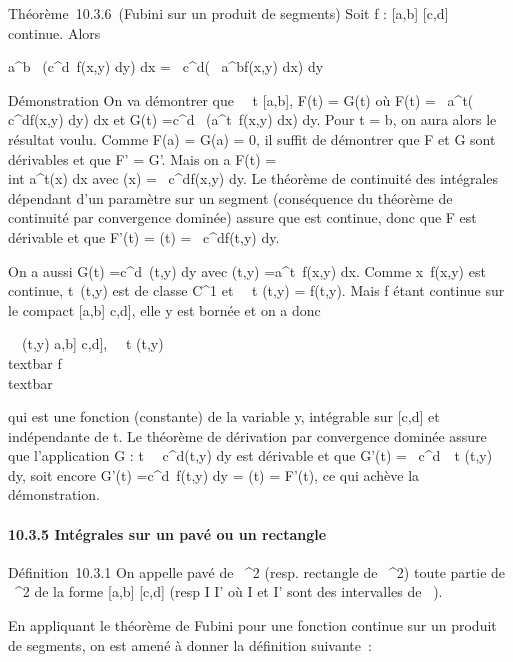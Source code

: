 Théorème~10.3.6~(Fubini sur un produit de segments) Soit f : {[}a,b{]} \times
{[}c,d{]} \rightarrow~  continue. Alors

\int  a^b~\left
(\int  c^d~f(x,y)
dy\right ) dx =\int ~
c^d\left (\int ~
a^bf(x,y) dx\right ) dy

Démonstration On va démontrer que \forall~~t \in
{[}a,b{]}, F(t) = G(t) où F(t) =\int ~
a^t\left (\int ~
c^df(x,y) dy\right ) dx et G(t)
=\int  c^d~\left
(\int  a^t~f(x,y)
dx\right ) dy. Pour t = b, on aura alors le résultat
voulu. Comme F(a) = G(a) = 0, il suffit de démontrer que F et G sont
dérivables et que F' = G'. Mais on a F(t) =\\int
 a^t\phi(x) dx avec \phi(x) =\int ~
c^df(x,y) dy. Le théorème de continuité des intégrales
dépendant d'un paramètre sur un segment (conséquence du théorème de
continuité par convergence dominée) assure que \phi est continue, donc que
F est dérivable et que F'(t) = \phi(t) =\int ~
c^df(t,y) dy.

On a aussi G(t) =\int  c^d~\psi(t,y)
dy avec \psi(t,y) =\int  a^t~f(x,y)
dx. Comme x\mapsto~f(x,y) est continue,
t\mapsto~\psi(t,y) est de classe C^1 et
\partial~\psi\over \partial~t (t,y) = f(t,y). Mais f étant continue sur
le compact {[}a,b{]} \times {[}c,d{]}, elle y est bornée et on a donc

\forall~~(t,y) \in {[}a,b{]} \times {[}c,d{]},
\left \textbar{}\partial~\psi\over \partial~t
(t,y)\right \textbar{}\leq\\textbar{}
f\\textbar{}\infty~

qui est une fonction (constante) de la variable y, intégrable sur
{[}c,d{]} et indépendante de t. Le théorème de dérivation par
convergence dominée assure que l'application G :
t\mapsto~\int ~
c^d\psi(t,y) dy est dérivable et que G'(t)
=\int ~
c^d\partial~\psi\over \partial~t (t,y) dy, soit encore
G'(t) =\int  c^d~f(t,y) dy = \phi(t)
= F'(t), ce qui achève la démonstration.

\paragraph{10.3.5 Intégrales sur un pavé ou un rectangle}

Définition~10.3.1 On appelle pavé de ~^2 (resp. rectangle de
~^2) toute partie de ~^2 de la forme {[}a,b{]} \times
{[}c,d{]} (resp I \times I' où I et I' sont des intervalles de ~).

En appliquant le théorème de Fubini pour une fonction continue sur un
produit de segments, on est amené à donner la définition suivante~:

